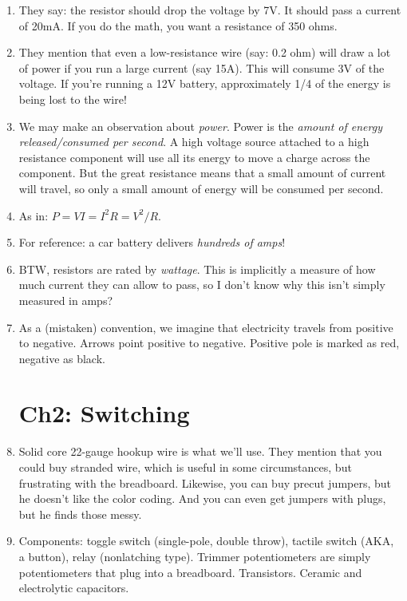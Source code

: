 \documentclass[11pt, oneside]{amsart}
\begin{document}
\begin{enumerate}
  \item They say: the resistor should drop the voltage by 7V. It should
  pass a current of 20mA. If you do the math, you want a resistance of
  350 ohms.

  \item They mention that even a low-resistance wire (say: 0.2 ohm) will
  draw a lot of power if you run a large current (say 15A). This will
  consume 3V of the voltage. If you're running a 12V battery,
  approximately 1/4 of the energy is being lost to the wire!

  \item We may make an observation about \emph{power}. Power is the
  \emph{amount of energy released/consumed per second}. A high voltage
  source attached to a high resistance component will use all its energy
  to move a charge across the component. But the great resistance means
  that a small amount of current will travel, so only a small amount of
  energy will be consumed per second.

  \item As in: $P = V I = I^2 R = V^2 / R$.

  \item For reference: a car battery delivers \emph{hundreds of amps}!

  \item BTW, resistors are rated by \emph{wattage}. This is implicitly a
  measure of how much current they can allow to pass, so I don't know
  why this isn't simply measured in amps?

  \item As a (mistaken) convention, we imagine that electricity travels
  from positive to negative. Arrows point positive to negative. Positive
  pole is marked as red, negative as black.

  \section{Ch2: Switching}

  \item Solid core 22-gauge hookup wire is what we'll use. They mention
  that you could buy stranded wire, which is useful in some
  circumstances, but frustrating with the breadboard. Likewise, you can
  buy precut jumpers, but he doesn't like the color coding. And you can
  even get jumpers with plugs, but he finds those messy.

  \item Components: toggle switch (single-pole, double throw), tactile
  switch (AKA, a button), relay (nonlatching type). Trimmer
  potentiometers are simply potentiometers that plug into a breadboard.
  Transistors. Ceramic and electrolytic capacitors.


\end{enumerate}
\end{document}
